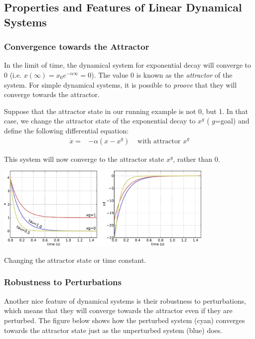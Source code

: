 {\itshape }\hypertarget{page_dyn_sys_sec_dyn_sys_properties}{}\subsection{Properties and Features of Linear Dynamical Systems}\label{page_dyn_sys_sec_dyn_sys_properties}
\hypertarget{page_dyn_sys_sec_dyn_sys_convergence}{}\subsubsection{Convergence towards the Attractor}\label{page_dyn_sys_sec_dyn_sys_convergence}
In the limit of time, the dynamical system for exponential decay will converge to 0 (i.\+e. $x(\infty) = x_0e^{-\alpha\infty} = 0$). The value 0 is known as the {\itshape attractor} of the system. For simple dynamical systems, it is possible to {\itshape proove} that they will converge towards the attractor.

Suppose that the attractor state in our running example is not 0, but 1. In that case, we change the attractor state of the exponential decay to $x^g$ ( $g$=goal) and define the following differential equation\+: \begin{eqnarray*} \dot{x} =& -\alpha(x-x^g) & \mbox{~with attractor } x^g \end{eqnarray*}

This system will now converge to the attractor state $x^g$, rather than 0.


\begin{DoxyImage}
\includegraphics[height=4cm]{change_tau_attr-svg}
\caption{Changing the attractor state or time constant.}
\end{DoxyImage}
\hypertarget{page_dyn_sys_sec_dyn_sys_perturbations}{}\subsubsection{Robustness to Perturbations}\label{page_dyn_sys_sec_dyn_sys_perturbations}
Another nice feature of dynamical systems is their robustness to perturbations, which means that they will converge towards the attractor even if they are perturbed. The figure below shows how the perturbed system (cyan) converges towards the attractor state just as the unperturbed system (blue) does.


